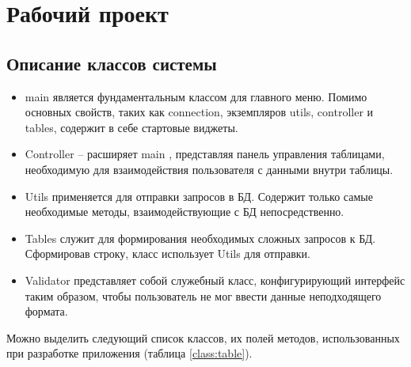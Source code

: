 \section{Рабочий проект}
\subsection{Описание классов системы}

\begin{itemize}
	\item \textquotedbl main \textquotedbl является фундаментальным классом для главного меню. Помимо основных свойств, таких как connection, экземпляров utils, controller и tables, содержит в себе стартовые виджеты.
	\item \textquotedbl Controller \textquotedbl -- расширяет \textquotedbl main \textquotedbl, представляя панель управления таблицами, необходимую для взаимодействия пользователя с данными внутри таблицы.
	\item \textquotedbl Utils \textquotedbl применяется для отправки запросов в БД. Содержит только самые необходимые методы, взаимодействующие с БД непосредственно.
	\item \textquotedbl Tables \textquotedbl служит для формирования необходимых сложных запросов к БД. Сформировав строку, класс использует \textquotedbl Utils \textquotedbl для отправки.
	\item \textquotedbl Validator \textquotedbl представляет собой служебный класс, конфигурирующий интерфейс таким образом, чтобы пользователь не мог ввести данные неподходящего формата.
\end{itemize}

Можно выделить следующий список классов, их полей методов, использованных при разработке приложения (таблица \ref{class:table}).

